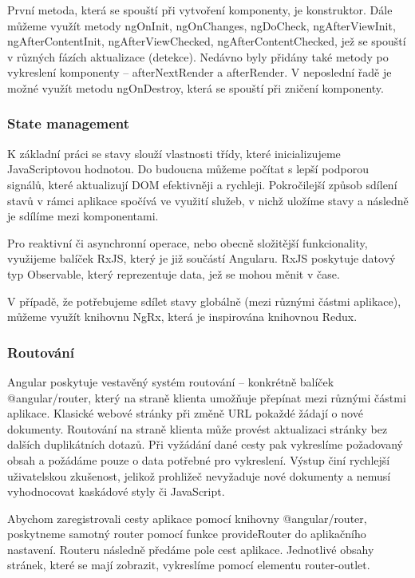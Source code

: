 První metoda, která se spouští při vytvoření komponenty, je konstruktor. 
Dále můžeme využít metody ngOnInit, ngOnChanges, ngDoCheck, ngAfterViewInit, ngAfterContentInit, ngAfterViewChecked, ngAfterContentChecked, jež se spouští v různých fázích aktualizace (detekce). 
Nedávno byly přidány také metody po vykreslení komponenty -- afterNextRender a afterRender. V neposlední řadě je možné využít metodu ngOnDestroy, která se spouští při zničení komponenty.\cite{angulardev,learningangular} 

\subsubsection{State management}

K základní práci se stavy slouží vlastnosti třídy, které inicializujeme JavaScriptovou hodnotou. 
Do budoucna můžeme počítat s lepší podporou signálů, které aktualizují DOM efektivněji a rychleji. 
Pokročilejší způsob sdílení stavů v rámci aplikace spočívá ve využití služeb, v nichž uložíme stavy a následně je sdílíme mezi komponentami.\cite{angulardev}

Pro reaktivní či asynchronní operace, nebo obecně složitější funkcionality, využijeme balíček RxJS, který je již součástí Angularu. 
RxJS poskytuje datový typ Observable, který reprezentuje data, jež se mohou měnit v čase.\cite{angulario,rxjslibrary}

V případě, že potřebujeme sdílet stavy globálně (mezi různými částmi aplikace), můžeme využít knihovnu NgRx, která je inspirována knihovnou Redux.\cite{angularstatemanagement,ngrxlib}

\subsubsection{Routování}

Angular poskytuje vestavěný systém routování -- konkrétně balíček @angular/router, který na straně klienta umožňuje přepínat mezi různými částmi aplikace. 
Klasické webové stránky při změně URL pokaždé žádají o nové dokumenty. Routování na straně klienta může provést aktualizaci stránky bez dalších duplikátních dotazů. 
Při vyžádání dané cesty pak vykreslíme požadovaný obsah a požádáme pouze o data potřebné pro vykreslení. 
Výstup činí rychlejší uživatelskou zkušenost, jelikož prohližeč nevyžaduje nové dokumenty a nemusí vyhodnocovat kaskádové styly či JavaScript.

Abychom zaregistrovali cesty aplikace pomocí knihovny @angular/router, poskytneme samotný router pomocí funkce provideRouter do aplikačního nastavení. 
Routeru následně předáme pole cest aplikace. Jednotlivé obsahy stránek, které se mají zobrazit, vykreslíme pomocí elementu router-outlet.\cite{angulardev,learningangular}


